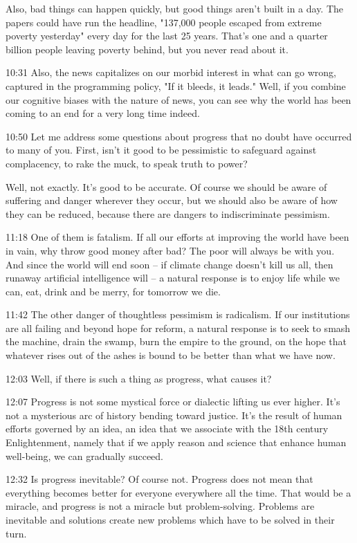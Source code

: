 \documentclass[10pt,titlepage]{article}
\begin{document}
Also, bad things can happen quickly,
but good things aren't built in a day.
The papers could have run the headline,
"137,000 people escaped from extreme poverty yesterday"
every day for the last 25 years.
That's one and a quarter billion people leaving poverty behind,
but you never read about it.

10:31
Also, the news capitalizes on our morbid interest
in what can go wrong,
captured in the programming policy, "If it bleeds, it leads."
Well, if you combine our cognitive biases with the nature of news,
you can see why the world has been coming to an end
for a very long time indeed.

10:50
Let me address some questions about progress
that no doubt have occurred to many of you.
First, isn't it good to be pessimistic
to safeguard against complacency,
to rake the muck, to speak truth to power?

Well, not exactly.
It's good to be accurate.
Of course we should be aware of suffering and danger
wherever they occur,
but we should also be aware of how they can be reduced,
because there are dangers to indiscriminate pessimism.

11:18
One of them is fatalism.
If all our efforts at improving the world
have been in vain,
why throw good money after bad?
The poor will always be with you.
And since the world will end soon --
if climate change doesn't kill us all,
then runaway artificial intelligence will --
a natural response is to enjoy life while we can,
eat, drink and be merry, for tomorrow we die.

11:42
The other danger of thoughtless pessimism is radicalism.
If our institutions are all failing and beyond hope for reform,
a natural response is to seek to smash the machine,
drain the swamp,
burn the empire to the ground,
on the hope that whatever rises out of the ashes
is bound to be better than what we have now.

12:03
Well, if there is such a thing as progress,
what causes it?

12:07
Progress is not some mystical force or dialectic lifting us ever higher.
It's not a mysterious arc of history bending toward justice.
It's the result of human efforts governed by an idea,
an idea that we associate with the 18th century Enlightenment,
namely that if we apply reason and science
that enhance human well-being,
we can gradually succeed.

12:32
Is progress inevitable? Of course not.
Progress does not mean that everything becomes better
for everyone everywhere all the time.
That would be a miracle, and progress is not a miracle
but problem-solving.
Problems are inevitable
and solutions create new problems which have to be solved in their turn.
\end{document}
